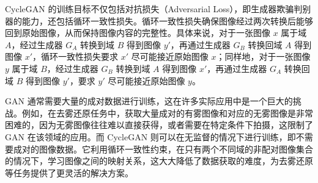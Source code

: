 CycleGAN 的训练目标不仅包括对抗损失（Adversarial Loss），即生成器欺骗判别器的能力，还包括循环一致性损失。循环一致性损失确保图像经过两次转换后能够回到原始图像，从而保持图像内容的完整性。具体来说，对于一张图像 $x$ 属于域 $A$，经过生成器 $G_A$ 转换到域 $B$ 得到图像 $y'$，再通过生成器 $G_B$ 转换回域 $A$ 得到图像 $x'$，循环一致性损失要求 $x'$ 尽可能接近原始图像 $x$；同样地，对于一张图像 $y$ 属于域 $B$，经过生成器 $G_B$ 转换到域 $A$ 得到图像 $x'$，再通过生成器 $G_A$ 转换回域 $B$ 得到图像 $y'$，要求 $y'$ 尽可能接近原始图像 $y$。

\begin{figure}[htb]
    \centering
    \captionsetup{font=footnotesize}
\end{figure}

\begin{figure}[htb]
    \centering
    \captionsetup{font=footnotesize}
\end{figure}

GAN 通常需要大量的成对数据进行训练，这在许多实际应用中是一个巨大的挑战。例如，在去雾还原任务中，获取大量成对的有雾图像和对应的无雾图像是非常困难的，因为无雾图像往往难以直接获得，或者需要在特定条件下拍摄，这限制了 GAN 在该领域的应用。而 CycleGAN 则可以在无监督的情况下进行训练，即不需要成对的图像数据。它利用循环一致性约束，在只有两个不同域的非配对图像集合的情况下，学习图像之间的映射关系，这大大降低了数据获取的难度，为去雾还原等任务提供了更灵活的解决方案。

